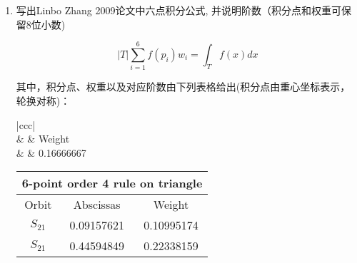 \documentclass[12pt,a4paper]{article}
\begin{document}
\begin{enumerate}
		对 $\phi \in P_2(K)$ 精确成立
		
		\begin{proof}
			令
			$$
				\phi_i=\lambda_i(2\lambda_i-1),\quad1\leq i\leq3
			$$	
			$$
			\phi_4=4\lambda_2\lambda_3,\phi_5=4\lambda_3\lambda_1,\phi_6=4\lambda_1\lambda_2
			$$
			
			对任意多项式$\phi\in P_2(K)$,有
			
			$$
			\phi=\sum_{i=1}^3\phi(a_i)\phi_i+\sum_{i=1}^3\phi(m_i)\phi_{i+3}, 
			$$

			由积分公式
			$$
			\iint_{K}\lambda_{1}^{m}\lambda_{2}^{n}\lambda_{3}^{k}\mathrm{d}x\mathrm{d}y=2S_K\frac{m!\cdot n!\cdot k!}{(m+n+k+2)!}.
			$$
			
			代入计算可得
			
				$$
			\int_K \phi \mathrm{dx} \approx \frac{S_K}{3} \sum_{i=4}^6 \phi\left(a_i\right)
			$$
		\end{proof}
		\item 写出Linbo Zhang 2009论文中六点积分公式, 并说明阶数（积分点和权重可保留8位小数)
		
		$$
		|T|\sum_{i=1}^6f(p_i)w_i=\int_Tf(x)dx
		$$
		
		其中，积分点、权重以及对应阶数由下列表格给出(积分点由重心坐标表示，轮换对称)：
		
		\begin{table}[h]
			\centering
			\begin{tabular}{|ccc|}
				\hline
				                                                                 \\ \hline
				 &                                                        & Weight     \\ \hline
				  &  & 0.16666667 \\ \hline
			\end{tabular}
		\end{table}
		
		\begin{table}[h]
			\centering
			\begin{tabular}{|ccc|}
				\hline
				\multicolumn{3}{|c|}{\textbf{6-point order 4 rule on triangle}}            \\ \hline
				\multicolumn{1}{|c|}{Orbit} & \multicolumn{1}{c|}{Abscissas}  & Weight     \\ \hline
				\multicolumn{1}{|c|}{$S_{21}$}   & \multicolumn{1}{c|}{0.09157621} & 0.10995174 \\ \hline
				\multicolumn{1}{|c|}{$S_{21}$}   & \multicolumn{1}{c|}{0.44594849} & 0.22338159 \\ \hline
			\end{tabular}
		\end{table}
	\end{enumerate}
	
	
\end{document}
